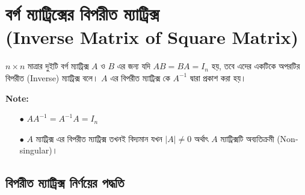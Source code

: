\section{বর্গ ম্যাট্রিক্সের বিপরীত ম্যাট্রিক্স \\(Inverse Matrix of Square Matrix)} 
\begin{tcolorbox}[colback=green!5!white,colframe=green!75!black,title=\textbf{সংজ্ঞা}]
	$n\times n$ মাত্রার দুইটি বর্গ ম্যাট্রিক্স $A$ ও $B$ এর জন্য যদি $AB=BA=I_n$ হয়, তবে এদের একটিকে অপরটির বিপরীত (Inverse) ম্যাট্রিক্স বলে। $A$ এর বিপরীত ম্যাট্রিক্স কে $A^{-1}$ দ্বারা প্রকাশ করা হয়।
\end{tcolorbox}
\begin{tcolorbox}
	\textbf{Note:}
	\begin{itemize}
		\item[$\bullet$] $AA^{-1}=A^{-1}A=I_n$
		\item[$\bullet$] $A$ ম্যাট্রিক্স এর বিপরীত ম্যাট্রিক্স তখনই বিদ্যমান যখন $|A|\neq 0$ অর্থাৎ $A$ ম্যাট্রিক্সটি অব্যতিক্রমী (Non-singular)।  
	\end{itemize}
\end{tcolorbox}
\subsection{বিপরীত ম্যাট্রিক্স নির্ণয়ের পদ্ধতি}
